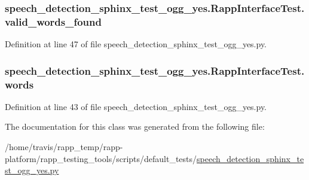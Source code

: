 \hypertarget{classspeech__detection__sphinx__test__ogg__yes_1_1RappInterfaceTest_a26665541d84685e574316fbdcd079d5c}{
\subsubsection[{valid\-\_\-words\-\_\-found}]{\setlength{\rightskip}{0pt plus 5cm}speech\-\_\-detection\-\_\-sphinx\-\_\-test\-\_\-ogg\-\_\-yes.\-Rapp\-Interface\-Test.\-valid\-\_\-words\-\_\-found}}\label{classspeech__detection__sphinx__test__ogg__yes_1_1RappInterfaceTest_a26665541d84685e574316fbdcd079d5c}


Definition at line 47 of file speech\-\_\-detection\-\_\-sphinx\-\_\-test\-\_\-ogg\-\_\-yes.\-py.

\hypertarget{classspeech__detection__sphinx__test__ogg__yes_1_1RappInterfaceTest_af8b46ae1a770a1bd5dac4121663e7345}{
\subsubsection[{words}]{\setlength{\rightskip}{0pt plus 5cm}speech\-\_\-detection\-\_\-sphinx\-\_\-test\-\_\-ogg\-\_\-yes.\-Rapp\-Interface\-Test.\-words}}\label{classspeech__detection__sphinx__test__ogg__yes_1_1RappInterfaceTest_af8b46ae1a770a1bd5dac4121663e7345}


Definition at line 43 of file speech\-\_\-detection\-\_\-sphinx\-\_\-test\-\_\-ogg\-\_\-yes.\-py.



The documentation for this class was generated from the following file\-:\begin{DoxyCompactItemize}
\item 
/home/travis/rapp\-\_\-temp/rapp-\/platform/rapp\-\_\-testing\-\_\-tools/scripts/default\-\_\-tests/\hyperlink{speech__detection__sphinx__test__ogg__yes_8py}{speech\-\_\-detection\-\_\-sphinx\-\_\-test\-\_\-ogg\-\_\-yes.\-py}\end{DoxyCompactItemize}
